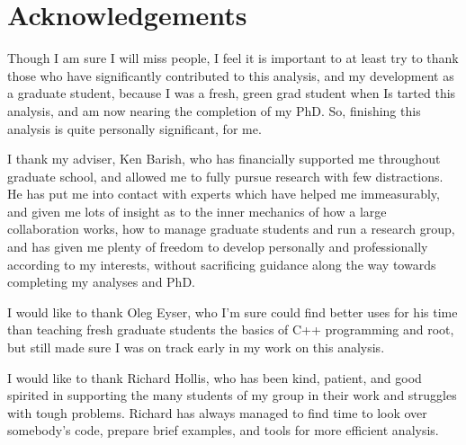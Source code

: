 

\chapter{Acknowledgements} 
\label{ch:Acknowledgements}

Though I am sure I will miss people, I feel it is important to at least try to thank those
who have significantly contributed to this analysis, and my development as a graduate
student, because I was a fresh, green grad student when Is tarted this analysis, and am
now nearing the completion of my PhD. So, finishing this analysis is quite personally
significant, for me. 

I thank my adviser, Ken Barish, who has financially supported me throughout graduate
school, and allowed me to fully pursue research with few distractions. He has put me into
contact with experts which have helped me immeasurably, and given me lots of insight as to
the inner mechanics of how a large collaboration works, how to manage graduate students
and run a research group, and has given me plenty of freedom to develop personally and
professionally according to my interests, without sacrificing guidance along the way
towards completing my analyses and PhD.

I would like to thank Oleg Eyser, who I'm sure could find better uses for his time than
teaching fresh graduate students the basics of C++ programming and root, but still made
sure I was on track early in my work on this analysis.

I would like to thank Richard Hollis, who has been kind, patient, and good spirited in
supporting the many students of my group in their work and struggles with tough problems.
Richard has always managed to find time to look over somebody's code, prepare brief
examples, and tools for more efficient analysis.

